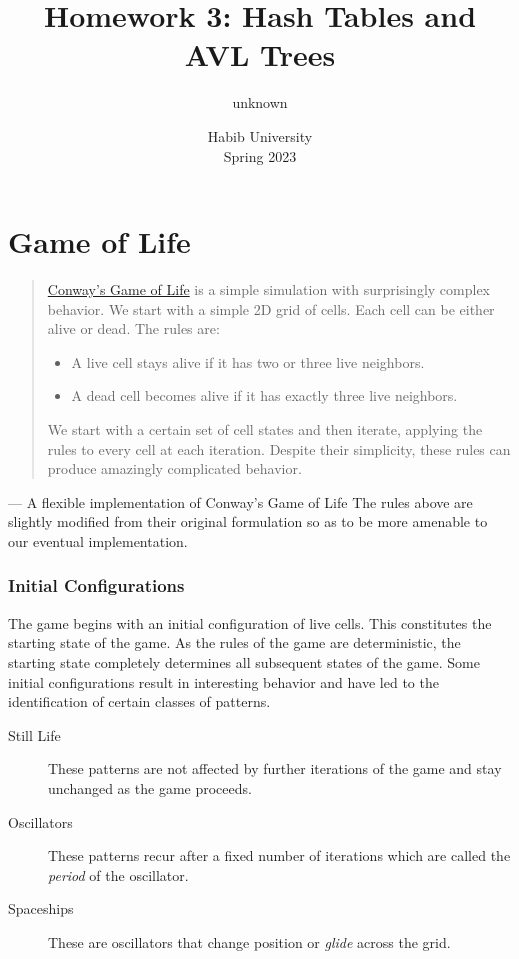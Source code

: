 \documentclass[addpoints]{exam}
\title{Homework 3: Hash Tables and AVL Trees}
\author{unknown}  %
\date{Habib University\\Spring 2023}
\begin{document}
\maketitle
\part{Game of Life}
\label{sec:imgops}

\begin{quotation}
  \href{https://en.wikipedia.org/wiki/Conway's_Game_of_Life}{Conway’s Game of Life} is a simple simulation with surprisingly complex behavior. We start with a simple 2D grid of cells. Each cell can be either alive or dead. The rules are:
  \begin{itemize}
    \item A live cell stays alive if it has two or three live neighbors.
    \item A dead cell becomes alive if it has exactly three live neighbors.
  \end{itemize}
  We start with a certain set of cell states and then iterate, applying the rules to every cell at each iteration. Despite their simplicity, these rules can produce amazingly complicated behavior.
\end{quotation}
\raggedleft --- A flexible implementation of Conway's Game of Life \cite{gol_impl}
\justify
The rules above are slightly modified from their original formulation so as to be more amenable to our eventual implementation.

\section*{Initial Configurations}

The game begins with an initial configuration of live cells. This constitutes the starting state of the game. As the rules of the game are deterministic, the starting state completely determines all subsequent states of the game. Some initial configurations result in interesting behavior and have led to the identification of certain classes of patterns.
\begin{description}
  \item[Still Life] These patterns are not affected by further iterations of the game and stay unchanged as the game proceeds.
  \item[Oscillators] These patterns recur after a fixed number of iterations which are called the \textit{period} of the oscillator.
  \item[Spaceships] These are oscillators that change position or \textit{glide} across the grid.
\end{description}
\end{document}
